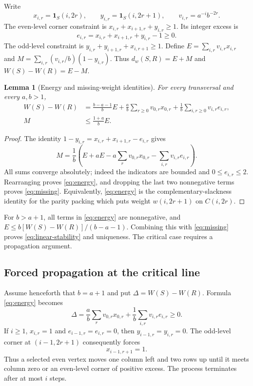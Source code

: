 \documentclass[11pt,a4paper]{article}
\newtheorem{lemma}[theorem]{Lemma}
\theoremstyle{definition}
\theoremstyle{remark}\newtheorem{remark}[theorem]{Remark}
\begin{document}
Write
\[
 x_{i,r}=\mathbf1_S(i,2r),\qquad
 y_{i,r}=\mathbf1_S(i,2r+1),\qquad
 v_{i,r}=a^{-i}b^{-2r}.
\]
The even-level corner constraint is
$x_{i,r}+x_{i+1,r}+y_{i,r}\ge1$. Its integer excess is
\[
 e_{i,r}=x_{i,r}+x_{i+1,r}+y_{i,r}-1\ge0.
\]
The odd-level constraint is
$y_{i,r}+y_{i+1,r}+x_{i,r+1}\ge1$.
Define $E=\sum_{i,r}v_{i,r}x_{i,r}$ and
$M=\sum_{i,r}(v_{i,r}/b)(1-y_{i,r})$. Thus
$d_w(S,R)=E+M$ and $W(S)-W(R)=E-M$.

\begin{lemma}[Energy and missing-weight identities]\label{lem:energy}
For every transversal and every $a,b>1$,
\begin{align}
 W(S)-W(R)
 &=\frac{b-a-1}{b}E
   +\frac ab\sum_{r\ge0}v_{0,r}x_{0,r}
   +\frac1b\sum_{i,r\ge0}v_{i,r}e_{i,r},\label{eq:energy}\\
 M&\le\frac{1+a}{b}E.\label{eq:missing}
\end{align}
\end{lemma}
\begin{proof}
The identity $1-y_{i,r}=x_{i,r}+x_{i+1,r}-e_{i,r}$ gives
\[
 M=\frac1b\left(E+aE-a\sum_r v_{0,r}x_{0,r}
                 -\sum_{i,r}v_{i,r}e_{i,r}\right).
\]
All sums converge absolutely; indeed the indicators are bounded and
$0\le e_{i,r}\le2$. Rearranging proves \eqref{eq:energy}, and dropping
the last two nonnegative terms proves \eqref{eq:missing}.
Equivalently, \eqref{eq:energy} is the complementary-slackness identity
for the parity packing which puts weight $w(i,2r+1)$ on $C(i,2r)$.
\end{proof}

For $b>a+1$, all terms in \eqref{eq:energy} are nonnegative, and
$E\le b[W(S)-W(R)]/(b-a-1)$. Combining this with
\eqref{eq:missing} proves \eqref{eq:linear-stability} and uniqueness.
The critical case requires a propagation argument.

\subsection{Forced propagation at the critical line}

Assume henceforth that $b=a+1$ and put $\Delta=W(S)-W(R)$. Formula
\eqref{eq:energy} becomes
\begin{equation}\label{eq:critical-energy}
 \Delta=\frac ab\sum_r v_{0,r}x_{0,r}
           +\frac1b\sum_{i,r}v_{i,r}e_{i,r}\ge0.
\end{equation}
If $i\ge1$, $x_{i,r}=1$ and $e_{i-1,r}=e_{i,r}=0$, then
$y_{i-1,r}=y_{i,r}=0$. The odd-level corner at $(i-1,2r+1)$ consequently
forces
\begin{equation}\label{eq:forced-step}
 x_{i-1,r+1}=1.
\end{equation}
Thus a selected even vertex moves one column left and two rows up until
it meets column zero or an even-level corner of positive excess.
The process terminates after at most $i$ steps.
\end{document}
